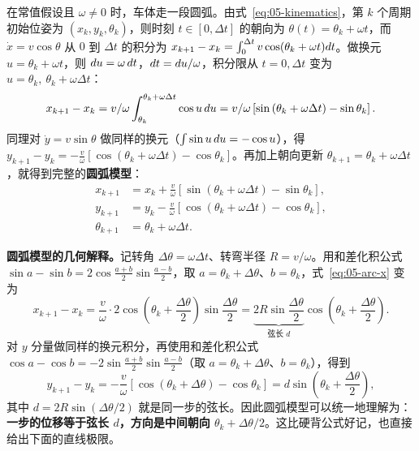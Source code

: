 在常值假设且 $\omega\ne0$ 时，车体走一段圆弧。由式~\eqref{eq:05-kinematics}，第 $k$ 个周期初始位姿为 $(x_k,y_k,\theta_k)$，则时刻 $t\in[0,\Delta t]$ 的朝向为 $\theta(t)=\theta_k+\omega t$，而 $\dot{x}=v\cos\theta$ 从 $0$ 到 $\Delta t$ 的积分为 $x_{k+1}-x_k=\int_{0}^{\Delta t}v\cos(\theta_k+\omega t)d t$。做换元 $u=\theta_k+\omega t$，则 $d u=\omega\,d t$，$d t=d u/\omega$，积分限从 $t=0,\Delta t$ 变为 $u=\theta_k,\ \theta_k+\omega\Delta t$：
\begin{equation}
  x_{k+1}-x_k
  = v/\omega\int_{\theta_k}^{\theta_k+\omega\Delta t}\cos u\,d u
  = v/\omega\left[\sin\left(\theta_k+\omega\Delta t\right)-\sin\theta_k\right].
  \label{eq:05-arc-x}
\end{equation}
同理对 $\dot{y}=v\sin\theta$ 做同样的换元（$\int\sin u\,d u=-\cos u$），得 $y_{k+1}-y_k=-\frac{v}{\omega}[\cos(\theta_k+\omega\Delta t)-\cos\theta_k]$。再加上朝向更新 $\theta_{k+1}=\theta_k+\omega\Delta t$，就得到完整的\textbf{圆弧模型}：
\begin{equation}
  \begin{aligned}
    x_{k+1} &= x_k + \frac{v}{\omega}\left[\sin\left(\theta_k+\omega\Delta t\right)-\sin\theta_k\right],\\
    y_{k+1} &= y_k - \frac{v}{\omega}\left[\cos\left(\theta_k+\omega\Delta t\right)-\cos\theta_k\right],\\
    \theta_{k+1} &= \theta_k+\omega\Delta t.
  \end{aligned}
  \label{eq:05-arc}
\end{equation}

\textbf{圆弧模型的几何解释。}记转角 $\Delta\theta=\omega\Delta t$、转弯半径 $R=v/\omega$。用和差化积公式 $\sin a-\sin b=2\cos\frac{a+b}{2}\sin\frac{a-b}{2}$，取 $a=\theta_k+\Delta\theta$、$b=\theta_k$，式~\eqref{eq:05-arc-x} 变为
\begin{equation}
  x_{k+1}-x_k
  = \frac{v}{\omega}\cdot2\cos\left(\theta_k+\frac{\Delta\theta}{2}\right)\sin\frac{\Delta\theta}{2}
  = \underbrace{2R\sin\frac{\Delta\theta}{2}}_{\text{弦长 }d}
  \cos\left(\theta_k+\frac{\Delta\theta}{2}\right).
\end{equation}
对 $y$ 分量做同样的换元积分，再使用和差化积公式 $\cos a-\cos b=-2\sin\frac{a+b}{2}\sin\frac{a-b}{2}$（取 $a=\theta_k+\Delta\theta$、$b=\theta_k$），得到
\begin{equation}
  y_{k+1}-y_k
  = -\frac{v}{\omega}\left[\cos\left(\theta_k+\Delta\theta\right)-\cos\theta_k\right]
  = d\sin\left(\theta_k+\frac{\Delta\theta}{2}\right),
\end{equation}
其中 $d=2R\sin(\Delta\theta/2)$ 就是同一步的弦长。因此圆弧模型可以统一地理解为：\textbf{一步的位移等于弦长 $d$，方向是中间朝向 $\theta_k+\Delta\theta/2$}。这比硬背公式好记，也直接给出下面的直线极限。

